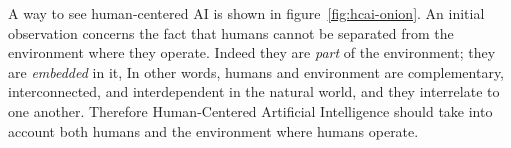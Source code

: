 


A way to see human-centered AI is shown in
figure~\ref{fig:hcai-onion}.  An initial observation concerns the fact
that humans cannot be separated from the environment where they
operate. Indeed they are \emph{part} of the environment; they are
\emph{embedded} in it, In other words, humans and environment are
complementary, interconnected, and interdependent in the natural
world, and they interrelate to one another. Therefore Human-Centered Artificial
Intelligence should take into account both humans and the
environment where humans operate.

